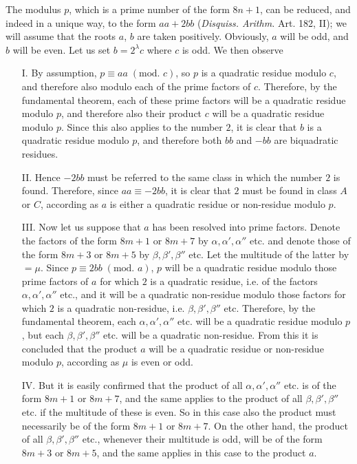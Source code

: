 \documentclass{book}
\theoremstyle{plain}
\theoremstyle{remark}
\begin{document}
The modulus $p$, which is a prime number of the form $8n+1$, can be reduced, and indeed in a unique way, to the form $aa + 2bb$ (\textit{Disquiss. Arithm.} Art. 182, II);  we will assume that the roots $a$, $b$ are taken positively.  Obviously, $a$ will be odd, and $b$ will be even.  Let us set $b = 2^{\lambda} c$ where $c$ is odd.  We then observe
\begin{enumerate}
\item[I.] By assumption, $p \equiv aa \; (\textrm{mod. }c)$,  so $p$ is a quadratic residue modulo $c$, and therefore also modulo each of the prime factors of $c$.   Therefore, by the fundamental theorem, each of these prime factors will be a quadratic residue modulo $p$, and therefore also their product $c$ will be a quadratic residue modulo $p$.  Since this also applies to the number $2$, it is clear that $b$ is a quadratic residue modulo $p$, and therefore both $bb$ and $-bb$ are biquadratic residues.  
\item[II.] Hence $-2bb$ must be referred to the same class in which the number $2$ is found.  Therefore, since $aa\equiv-2bb$, it is clear that $2$ must be found in class $A$ or $C$, according as $a$ is either a quadratic residue or non-residue modulo $p$. 
\item[III.] Now let us suppose that $a$ has been resolved into prime factors. Denote the factors of the form $8m+1$ or $8m+7$ by $\alpha, \alpha', \alpha''$ etc. and denote those of the form $8m+3$ or $8m+5$ by $\beta, \beta', \beta''$ etc.  Let the multitude of the latter by $=\mu$.   Since $p \equiv 2bb \; (\textrm{mod. }a)$, $p$ will be a quadratic residue modulo those prime factors of $a$ for which $2$ is a quadratic residue, i.e. of the factors $\alpha, \alpha', \alpha''$ etc., and it will be a quadratic non-residue modulo those factors for which $2$ is a quadratic non-residue, i.e. $\beta, \beta', \beta''$ etc.  Therefore, by the fundamental theorem, each $\alpha, \alpha', \alpha''$ etc. will be a quadratic residue modulo $p$, but each $\beta, \beta', \beta''$ etc. will be a quadratic non-residue.  From this it is concluded that the product $a$ will be a quadratic residue or non-residue modulo $p$, according as $\mu$ is even or odd.
\item[IV.] But it is easily confirmed that the product of all $\alpha, \alpha', \alpha''$ etc. is of the form $8m+1$ or $8m+7$, and the same applies to the product of all $\beta,\beta',\beta''$etc. if the multitude of these is even.  So in this case also the product must necessarily be of the form $8m+1$ or $8m+7$.  On the other hand, the product of all $\beta, \beta', \beta''$ etc., whenever their multitude is odd, will be of the form $8m+3$ or $8m+5$, and the same applies in this case to the product $a$.  


\end{enumerate}
\end{document}
